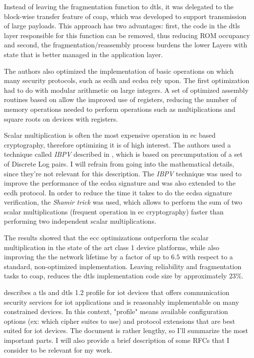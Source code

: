 \documentclass{llncs}
\begin{document}
Instead of leaving the fragmentation function to \gls{dtls}, it was
delegated to the block-wise transfer feature of \gls{coap}\cite{RFC7959}, which was developed
to support transmission of large payloads. This approach has two advantages: first, the code in the \gls{dtls}
layer responsible for this function can be removed, thus reducing ROM occupancy
and second, the fragmentation/reassembly process burdens the lower Layers
with state that is better managed in the application layer.

The authors also optimized the implementation of basic operations on which
many security protocols, such as \gls{ecdh} and \gls{ecdsa} rely upon. The first
optimization had to do with modular arithmetic on large integers. A set of optimized
assembly routines based on \cite{Comparin25:Online} allow the improved use of
registers, reducing the number of memory operations needed to perform
operations such as multiplications and square roots on devices with 
registers.

Scalar multiplication is often the most expensive operation in \gls{ec} based
cryptography, therefore optimizing it is of high interest. The authors used a
technique called \textit{IBPV} described in \cite{LowcostS87:online}, which is based on precumputation
of a set of Discrete Log pairs. I will refrain from going into the mathematical details,
since they're not relevant for this description. The \textit{IBPV} technique was used
to improve the performance of the \gls{ecdsa} signature and was also extended to the
\gls{ecdh} protocol. In order to reduce the time it takes to do the \gls{ecdsa}
signature verification, the \textit{Shamir trick} was used, which allows
to perform the sum of two scalar multiplications (frequent operation in \gls{ec} cryptography)
faster than performing two independent scalar multiplications.

The results showed that the \gls{ecc} optimizations
outperform the scalar multiplication in the state of the art class 1 device platforms,
while also improving the the network lifetime by a factor of up to $6.5$ with
respect to a standard, non-optimized implementation. Leaving reliability and
fragmentation tasks to \gls{coap}, reduces the \gls{dtls} implementation code size
by approximately $23\%$.

\cite{RFC7925} describes a \gls{tls} and \gls{dtls} 1.2
profile for \gls{iot} devices that offers communication security services
for \gls{iot} applications and is reasonably implementable on many constrained devices.
In this context, "profile" means available configuration options (ex: which
cipher suites to use) and protocol extensions that are best suited for \gls{iot} devices.
The document is rather lengthy, so I'll summarize the most important parts. I will
also provide a brief description of some RFCs that I consider to be relevant for
my work.
\end{document}
